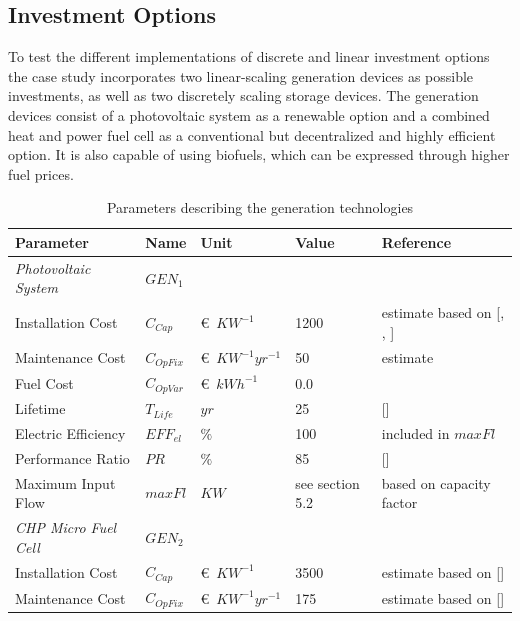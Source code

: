 \documentclass[
	11pt,								%
	DIV10,								%
	a4paper,         					%
	oneside,							%
	headheight=20pt,					%
	footheight=20pt,					%
    parskip=full,						%
    listof=totoc,						%
	bibliography=totoc,					%
	index=totoc,						%
]{scrartcl}
\begin{document}
\subsection{Investment Options}
To test the different implementations of discrete and linear investment options the case study incorporates two linear-scaling generation devices as possible investments, as well as two discretely scaling storage devices. The generation devices consist of a photovoltaic system as a renewable option and a combined heat and power fuel cell as a conventional but decentralized and highly efficient option. It is also capable of using biofuels, which can be expressed through higher fuel prices. 
\begin{table}[H]
	\centering
	\caption{Parameters describing the generation technologies}
	\begin{tabulary}{\linewidth}{lllll}
		\hline
		\textbf{Parameter}			& \textbf{Name}			& \textbf{Unit}			& \textbf{Value}	&\textbf{Reference}     \\ \hline
		\textit{Photovoltaic System} & $GEN_1$ & & &\\
		Installation Cost           & $C_{Cap}$     		& \euro\ $KW^{-1}$  		& 1200				& estimate based on [\cite{wirthAktuelleFaktenZur2018}, \cite{SolarmoduleEBay2018}, \cite{ModulePriceIndex2018}] \\
		Maintenance Cost            & $C_{OpFix}$     		& \euro\ $KW^{-1}yr^{-1}$& 50				& estimate \\
		Fuel	 Cost           			& $C_{OpVar}$     		& \euro\ $kWh^{-1}$   	& 0.0			&   \\
		Lifetime                    & $T_{Life}$     		& $yr$  				& 25 				& [\cite{wirthAktuelleFaktenZur2018}]   \\
		Electric Efficiency         & $EFF_{el}$     		& $\%$  				& 100				& included in $maxFl$      \\
		Performance Ratio           & $PR$     		& $\%$  				& 85				& [\cite{wirthAktuelleFaktenZur2018}]   \\
		Maximum Input Flow  			& $maxFl$     		& $KW$ 		 			& see section 5.2				& based on capacity factor   \\
		\hline
		\textit{CHP Micro Fuel Cell} & $GEN_2$ & & &\\
		Installation Cost           & $C_{Cap}$     		& \euro\ $KW^{-1}$  		& 3500 				& estimate based on [\cite{LAUINGER201624}]   \\
		Maintenance Cost            & $C_{OpFix}$     		& \euro\ $KW^{-1}yr^{-1}$& 175				& estimate based on [\cite{LAUINGER201624}]   \\

\end{tabulary}
\end{table}
\end{document}
